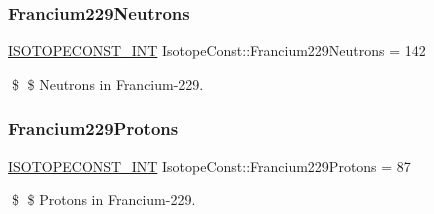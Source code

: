 \subsubsection{\texorpdfstring{Francium229\+Neutrons}{Francium229Neutrons}}
{\footnotesize\ttfamily \mbox{\hyperlink{group___isotope_const-_macros_ga5f18360b3e99483a35c32d789e62621c}{I\+S\+O\+T\+O\+P\+E\+C\+O\+N\+S\+T\+\_\+\+I\+NT}} Isotope\+Const\+::\+Francium229\+Neutrons = 142}

\$ \$ Neutrons in Francium-\/229. \mbox{\label{group___isotope_const-_francium-_fr229_ga36c1e72b7bb8e3e694af951df9b8eaa0}} 
\subsubsection{\texorpdfstring{Francium229\+Protons}{Francium229Protons}}
{\footnotesize\ttfamily \mbox{\hyperlink{group___isotope_const-_macros_ga5f18360b3e99483a35c32d789e62621c}{I\+S\+O\+T\+O\+P\+E\+C\+O\+N\+S\+T\+\_\+\+I\+NT}} Isotope\+Const\+::\+Francium229\+Protons = 87}

\$ \$ Protons in Francium-\/229. 